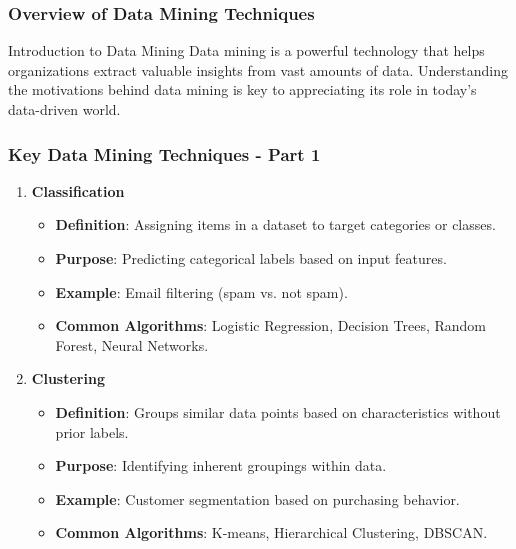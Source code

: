 \documentclass[aspectratio=169]{beamer}
\begin{document}
\begin{frame}[fragile]
    \frametitle{Overview of Data Mining Techniques}
    \begin{block}{Introduction to Data Mining}
        Data mining is a powerful technology that helps organizations extract valuable insights from vast amounts of data.
        Understanding the motivations behind data mining is key to appreciating its role in today’s data-driven world.
    \end{block}
\end{frame}

\begin{frame}[fragile]
    \frametitle{Key Data Mining Techniques - Part 1}
    \begin{enumerate}
        \item \textbf{Classification}
        \begin{itemize}
            \item \textbf{Definition}: Assigning items in a dataset to target categories or classes.
            \item \textbf{Purpose}: Predicting categorical labels based on input features.
            \item \textbf{Example}: Email filtering (spam vs. not spam).
            \item \textbf{Common Algorithms}: Logistic Regression, Decision Trees, Random Forest, Neural Networks.
        \end{itemize}
        
        \item \textbf{Clustering}
        \begin{itemize}
            \item \textbf{Definition}: Groups similar data points based on characteristics without prior labels.
            \item \textbf{Purpose}: Identifying inherent groupings within data.
            \item \textbf{Example}: Customer segmentation based on purchasing behavior.
            \item \textbf{Common Algorithms}: K-means, Hierarchical Clustering, DBSCAN.
        \end{itemize}
    \end{enumerate}
\end{frame}
\end{document}
